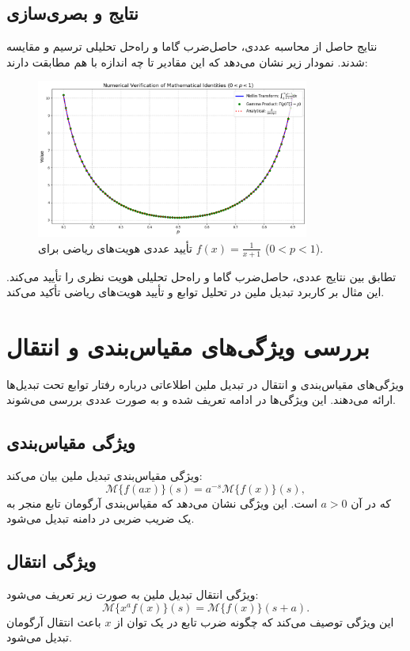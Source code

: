 \documentclass[12pt,a4paper]{article}
\begin{document}
\subsection{نتایج و بصری‌سازی}
نتایج حاصل از محاسبه عددی، حاصل‌ضرب گاما و راه‌حل تحلیلی ترسیم و مقایسه شدند. نمودار زیر نشان می‌دهد که این مقادیر تا چه اندازه با هم مطابقت دارند:

\begin{figure}[H]
    \centering
    \includegraphics[width=0.8\textwidth]{Example.png}
    \caption{تأیید عددی هویت‌های ریاضی برای $f(x) = \frac{1}{x+1}$ ($0 < p < 1$).}
    \label{fig:mellin_identity}
\end{figure}

تطابق بین نتایج عددی، حاصل‌ضرب گاما و راه‌حل تحلیلی هویت نظری را تأیید می‌کند. این مثال بر کاربرد تبدیل ملین در تحلیل توابع و تأیید هویت‌های ریاضی تأکید می‌کند.
\section{بررسی ویژگی‌های مقیاس‌بندی و انتقال}

ویژگی‌های مقیاس‌بندی و انتقال در تبدیل ملین اطلاعاتی درباره رفتار توابع تحت تبدیل‌ها ارائه می‌دهند. این ویژگی‌ها در ادامه تعریف شده و به صورت عددی بررسی می‌شوند.

\subsection{ویژگی مقیاس‌بندی}
ویژگی مقیاس‌بندی تبدیل ملین بیان می‌کند:
\begin{equation}
\mathcal{M}\{f(ax)\}(s) = a^{-s} \mathcal{M}\{f(x)\}(s),
\end{equation}
که در آن $a > 0$ است. این ویژگی نشان می‌دهد که مقیاس‌بندی آرگومان تابع منجر به یک ضریب ضربی در دامنه تبدیل می‌شود.

\subsection{ویژگی انتقال}
ویژگی انتقال تبدیل ملین به صورت زیر تعریف می‌شود:
\begin{equation}
\mathcal{M}\{x^a f(x)\}(s) = \mathcal{M}\{f(x)\}(s + a).
\end{equation}
این ویژگی توصیف می‌کند که چگونه ضرب تابع در یک توان از $x$ باعث انتقال آرگومان تبدیل می‌شود.
\end{document}
